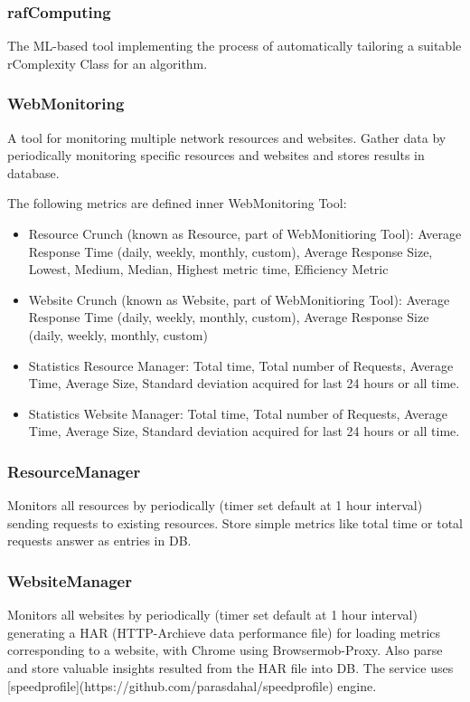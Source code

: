 \subsubsection{rafComputing}
The ML-based tool implementing the process of automatically tailoring a suitable rComplexity Class for an algorithm.

\subsubsection{WebMonitoring}
A tool for monitoring multiple network resources and websites. 
Gather data by periodically monitoring specific resources and websites and stores results in database.

The following metrics are defined inner WebMonitoring Tool:
\begin{itemize}
	\item Resource Crunch (known as Resource, part of WebMonitioring Tool): Average Response Time (daily, weekly, monthly, custom), Average Response Size, Lowest, Medium, Median, Highest metric time, Efficiency Metric	
	\item Website Crunch (known as Website, part of WebMonitioring Tool): Average Response Time (daily, weekly, monthly, custom), Average Response Size (daily, weekly, monthly, custom)
	\item Statistics Resource Manager: Total time, Total number of Requests, Average Time, Average Size, Standard deviation acquired for last 24 hours or all time.
	\item Statistics Website Manager: Total time, Total number of Requests, Average Time, Average Size, Standard deviation acquired for last 24 hours or all time.
\end{itemize}

\subsubsection{ResourceManager}
Monitors all resources by periodically (timer set default at 1 hour interval) sending requests to existing resources.
Store simple metrics like total time or total requests answer as entries in DB. 

\subsubsection{WebsiteManager}
Monitors all websites by periodically (timer set default at 1 hour interval) generating a HAR (HTTP-Archieve data performance file) for loading metrics corresponding to a website, with Chrome using Browsermob-Proxy.
Also parse and store valuable insights resulted from the HAR file into DB. 
The service uses [speedprofile](https://github.com/parasdahal/speedprofile) engine.


